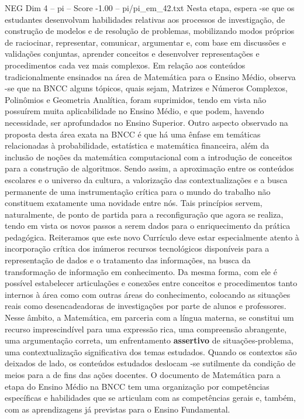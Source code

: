 \begin{textsample}{NEG Dim 4 – pi – Score -1.00 – pi/pi\_em\_42.txt}
Nesta etapa, espera -se que os estudantes desenvolvam habilidades relativas aos processos de investigação, de construção de modelos e de resolução de problemas, mobilizando modos próprios de raciocinar, representar, comunicar, argumentar e, com base em discussões e validações conjuntas, aprender conceitos e desenvolver representações e procedimentos cada vez mais complexos.
Em relação aos conteúdos tradicionalmente ensinados na área de Matemática para o Ensino Médio, observa -se que na BNCC alguns tópicos, quais sejam, Matrizes e Números Complexos, Polinômios e Geometria Analítica, foram suprimidos, tendo em vista não possuírem muita aplicabilidade no Ensino Médio, e que podem, havendo necessidade, ser aprofundados no Ensino Superior.
Outro aspecto observado na proposta desta área exata na BNCC é que há uma ênfase em temáticas relacionadas à probabilidade, estatística e matemática financeira, além da inclusão de noções da matemática computacional com a introdução de conceitos para a construção de algoritmos.
Sendo assim, a aproximação entre os conteúdos escolares e o universo da cultura, a valorização das contextualizações e a busca permanente de uma instrumentação crítica para o mundo do trabalho não constituem exatamente uma novidade entre nós.
Tais princípios servem, naturalmente, de ponto de partida para a reconfiguração que agora se realiza, tendo em vista os novos passos a serem dados para o enriquecimento da prática pedagógica.
Reiteramos que este novo Currículo deve estar especialmente atento à incorporação crítica dos inúmeros recursos tecnológicos disponíveis para a representação de dados e o tratamento das informações, na busca da transformação de informação em conhecimento.
Da mesma forma, com ele é possível estabelecer articulações e conexões entre conceitos e procedimentos tanto internos à área como com outras áreas do conhecimento, colocando as situações reais como desencadeadoras de investigações por parte de alunos e professores.
Nesse âmbito, a Matemática, em parceria com a língua materna, se constitui um recurso imprescindível para uma expressão rica, uma compreensão abrangente, uma argumentação correta, um enfrentamento \textbf{assertivo} de situações-problema, uma contextualização significativa dos temas estudados.
Quando os contextos são deixados de lado, os conteúdos estudados deslocam -se sutilmente da condição de meios para a de fins das ações docentes.
O documento de Matemática para a etapa do Ensino Médio na BNCC tem uma organização por competências específicas e habilidades que se articulam com as competências gerais e, também, com as aprendizagens já previstas para o Ensino Fundamental.

\end{textsample}

